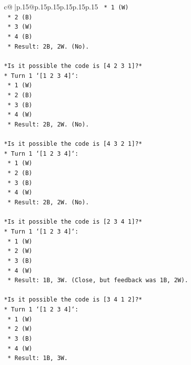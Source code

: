 \documentclass{article}
\begin{document}
{\begin{supertabular}{c@{$\;$}|p{.15\linewidth}@{}p{.15\linewidth}p{.15\linewidth}p{.15\linewidth}p{.15\linewidth}p{.15\linewidth}}
{{{\texttt{    *   1 (W)} \\
\texttt{    *   2 (B)} \\
\texttt{    *   3 (W)} \\
\texttt{    *   4 (B)} \\
\texttt{    *   Result: 2B, 2W. (No).} \\
\\ 
\texttt{*Is it possible the code is {[}4 2 3 1{]}?*} \\
\texttt{*   Turn 1 `{[}1 2 3 4{]}`:} \\
\texttt{    *   1 (W)} \\
\texttt{    *   2 (B)} \\
\texttt{    *   3 (B)} \\
\texttt{    *   4 (W)} \\
\texttt{    *   Result: 2B, 2W. (No).} \\
\\ 
\texttt{*Is it possible the code is {[}4 3 2 1{]}?*} \\
\texttt{*   Turn 1 `{[}1 2 3 4{]}`:} \\
\texttt{    *   1 (W)} \\
\texttt{    *   2 (B)} \\
\texttt{    *   3 (B)} \\
\texttt{    *   4 (W)} \\
\texttt{    *   Result: 2B, 2W. (No).} \\
\\ 
\texttt{*Is it possible the code is {[}2 3 4 1{]}?*} \\
\texttt{*   Turn 1 `{[}1 2 3 4{]}`:} \\
\texttt{    *   1 (W)} \\
\texttt{    *   2 (W)} \\
\texttt{    *   3 (B)} \\
\texttt{    *   4 (W)} \\
\texttt{    *   Result: 1B, 3W. (Close, but feedback was 1B, 2W).} \\
\\ 
\texttt{*Is it possible the code is {[}3 4 1 2{]}?*} \\
\texttt{*   Turn 1 `{[}1 2 3 4{]}`:} \\
\texttt{    *   1 (W)} \\
\texttt{    *   2 (W)} \\
\texttt{    *   3 (B)} \\
\texttt{    *   4 (W)} \\
\texttt{    *   Result: 1B, 3W.} \\
}}}
\end{supertabular}}
\end{document}

